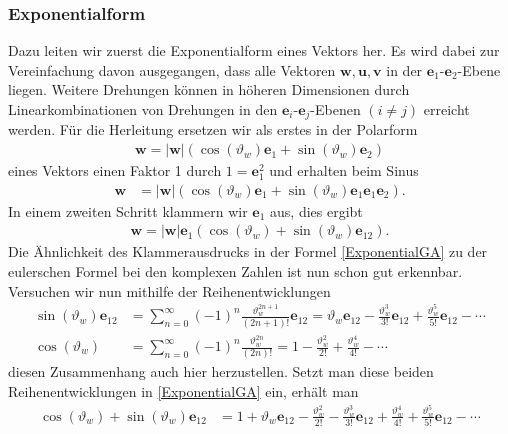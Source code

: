 \subsubsection{Exponentialform}
Dazu leiten wir zuerst die Exponentialform eines Vektors her. Es wird dabei zur Vereinfachung davon ausgegangen, dass alle Vektoren $\mathbf{w}, \mathbf{u}, \mathbf{v}$ in der $\mathbf{e}_{1}$-$\mathbf{e}_{2}$-Ebene liegen. Weitere Drehungen können in höheren Dimensionen durch Linearkombinationen von Drehungen in den $\mathbf{e}_{i}$-$\mathbf{e}_{j}$-Ebenen $(i\not=j)$ erreicht werden. Für die Herleitung ersetzen wir als erstes in der Polarform
\begin{align*}
\mathbf{w} = |\mathbf{w}| \left(\cos(\vartheta_w) \mathbf{e}_1 + \sin(\vartheta_w) \mathbf{e}_2\right)
\end{align*}
eines Vektors einen Faktor 1 durch $1=\mathbf{e}_1^2$ und erhalten beim Sinus
\begin{align}\label{e1ausklammern}
\mathbf{w} &= |\mathbf{w}| \left(\cos(\vartheta_w) \mathbf{e}_1 + \sin(\vartheta_w) \mathbf{e}_1\mathbf{e}_1\mathbf{e}_2\right). 
\end{align}
In einem zweiten Schritt klammern wir $\mathbf{e}_1$ aus, dies ergibt
\begin{align}
\mathbf{w} = |\mathbf{w}|\mathbf{e}_1\left(\cos(\vartheta_w)+ \sin(\vartheta_w) \mathbf{e}_{12}\right). \label{ExponentialGA}
\end{align}
Die Ähnlichkeit des Klammerausdrucks in der Formel \eqref{ExponentialGA} zu der eulerschen Formel bei den komplexen Zahlen ist nun schon gut erkennbar. Versuchen wir nun mithilfe der Reihenentwicklungen
%
%
\begin{align*}
\sin(\vartheta_w)\mathbf{e}_{12}&=\sum _{n=0}^{\infty }(-1)^{n}{\frac {\vartheta_w^{2n+1}}{(2n+1)!}}\mathbf{e}_{12} =\vartheta_w\mathbf{e}_{12}-{\frac {\vartheta_w^{3}}{3!}}\mathbf{e}_{12}+{\frac {\vartheta_w^{5}}{5!}}\mathbf{e}_{12}-\cdots \\
\cos(\vartheta_w)&=\sum _{n=0}^{\infty }(-1)^{n}{\frac {\vartheta_w^{2n}}{(2n)!}} =1-{\frac {\vartheta_w^{2}}{2!}}+{\frac {\vartheta_w^{4}}{4!}}-\cdots
\end{align*}
diesen Zusammenhang auch hier herzustellen. Setzt man diese beiden Reihenentwicklungen in \eqref{ExponentialGA} ein, erhält man
\begin{align*}
\cos(\vartheta_w)+ \sin(\vartheta_w) \mathbf{e}_{12} &= 1+\vartheta_w\mathbf{e}_{12}-{\frac {\vartheta_w^{2}}{2!}}-{\frac {\vartheta_w^{3}}{3!}}\mathbf{e}_{12}+{\frac {\vartheta_w^{4}}{4!}}+{\frac {\vartheta_w^{5}}{5!}}\mathbf{e}_{12}-\cdots
\end{align*}
